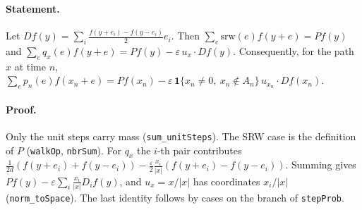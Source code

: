 \paragraph{Statement.} Let $Df(y)=\sum_i\frac{f(y+e_i)-f(y-e_i)}2e_i$. Then
$\sum_e \mathrm{srw}(e)f(y+e)=Pf(y)$ and
$\sum_e q_x(e)f(y+e)=Pf(y)-\varepsilon\,u_x\cdot Df(y)$. Consequently, for the path $x$ at
time $n$, $\sum_e p_n(e)f(x_n+e)=Pf(x_n)-\varepsilon\,\mathbf 1\{x_n\ne0,\ x_n\notin A_n\}\,u_{x_n}\cdot Df(x_n)$.
\paragraph{Proof.} Only the unit steps carry mass (\texttt{sum\_unitSteps}). The SRW case is the
definition of $P$ (\texttt{walkOp}, \texttt{nbrSum}). For $q_x$ the $i$-th pair contributes
$\frac1{2d}(f(y+e_i)+f(y-e_i))-\frac\varepsilon2\frac{x_i}{|x|}(f(y+e_i)-f(y-e_i))$. Summing gives
$Pf(y)-\varepsilon\sum_i\frac{x_i}{|x|}D_if(y)$, and $u_x=x/|x|$ has coordinates $x_i/|x|$
(\texttt{norm\_toSpace}). The last identity follows by cases on the branch of \texttt{stepProb}.
